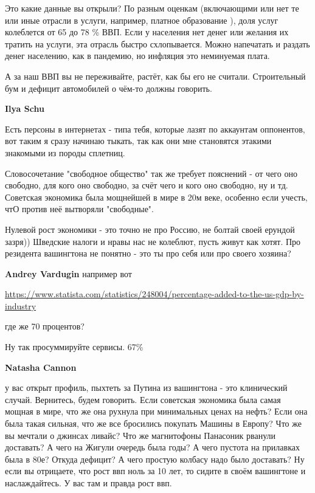 \begin{itemize}
\begin{itemize}

Это какие данные вы открыли? По разным оценкам (включающими или нет те или иные
отрасли в услуги, например, платное образование ), доля услуг колеблется от 65
до 78 \% ВВП. Если у населения нет денег или желания их тратить на услуги, эта
отрасль быстро схлопывается. Можно напечатать и раздать денег населению, как в
пандемию, но инфляция это неминуемая плата.

А за наш ВВП вы не переживайте, растёт, как бы его не считали. Строительный бум
и дефицит автомобилей о чём-то должны говорить.

\textbf{Ilya Schu} 

Есть персоны в интернетах - типа тебя, которые лазят по аккаунтам оппонентов,
вот таким я сразу начинаю тыкать, так как они мне становятся этакими знакомыми
из породы сплетниц.

Словосочетание "свободное общество" так же требует пояснений - от чего оно
свободно, для кого оно свободно, за счёт чего и кого оно свободно, ну и тд.
Советская экономика была мощнейшей в мире в 20м веке, особенно если учесть, чтО
против неё вытворяли "свободные".

Нулевой рост экономики - это точно не про Россию, не болтай своей ерундой
зазря)) Шведские налоги и нравы нас не колеблют, пусть живут как хотят. Про
резидента вашингтона не понятно - это ты про себя или про своего хозяина?

\textbf{Andrey Vardugin} например вот 

\url{https://www.statista.com/statistics/248004/percentage-added-to-the-us-gdp-by-industry}

где же 70 процентов?

Ну так просуммируйте сервисы. 67\%

\textbf{Natasha Cannon} 

у вас открыт профиль, пыхтеть за Путина из вашингтона - это клинический случай.
Вернитесь, будем говорить. Если советская экономика была самая мощная в мире,
что же она рухнула при минимальных ценах на нефть? Если она была такая сильная,
что же все бросились покупать Машины в Европу? Что же вы мечтали о джинсах
ливайс? Что же магнитофоны Панасоник рванули доставать? А чего на Жигули
очередь была годы? А чего пустота на прилавках была в 80е? Откуда дефицит? А
чего простую колбасу надо было доставать? Ну если вы отрицаете, что рост ввп
ноль за 10 лет, то сидите в своём вашингтоне и наслаждайтесь. У вас там и
правда рост ввп.


\end{itemize}
\end{itemize}
